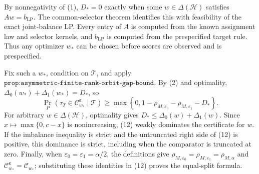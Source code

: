 By nonnegativity of (1), \(D_*=0\) exactly when some \(w\in\Delta(\mathcal H)\) satisfies \(Aw=b_{\mathrm{LP}}\). The common-selector theorem identifies this with feasibility of the exact joint-balance LP. Every entry of \(A\) is computed from the known assignment law and selector kernels, and \(b_{\mathrm{LP}}\) is computed from the prespecified target rule. Thus any optimizer \(w_*\) can be chosen before scores are observed and is prespecified.

Fix such a \(w_*\), condition on \(\mathcal T\), and apply \(\texttt{prop:asymmetric-finite-rank-orbit-gap-bound}\). By (2) and optimality, \(\Delta_0(w_*)+\Delta_1(w_*)=D_*\), so
\[
\Pr_P\!\left(\tau_T\in\mathcal C^{\boldsymbol\varepsilon}_{w_*}\mid\mathcal T\right)\ge\max\left\{0,1-\rho_{M,\varepsilon_0}-\rho_{M,\varepsilon_1}-D_*\right\}.
\tag{12}
\]
For arbitrary \(w\in\Delta(\mathcal H)\), optimality gives \(D_*\le\Delta_0(w)+\Delta_1(w)\). Since \(x\mapsto\max\{0,c-x\}\) is nonincreasing, (12) weakly dominates the certificate for \(w\). If the imbalance inequality is strict and the untruncated right side of (12) is positive, this dominance is strict, including when the comparator is truncated at zero. Finally, when \(\varepsilon_0=\varepsilon_1=\alpha/2\), the definitions give \(\rho_{M,\varepsilon_0}=\rho_{M,\varepsilon_1}=\rho_{M,\alpha}\) and \(\mathcal C^{\boldsymbol\varepsilon}_{w_*}=\mathcal C_{w_*}\); substituting these identities in (12) proves the equal-split formula.